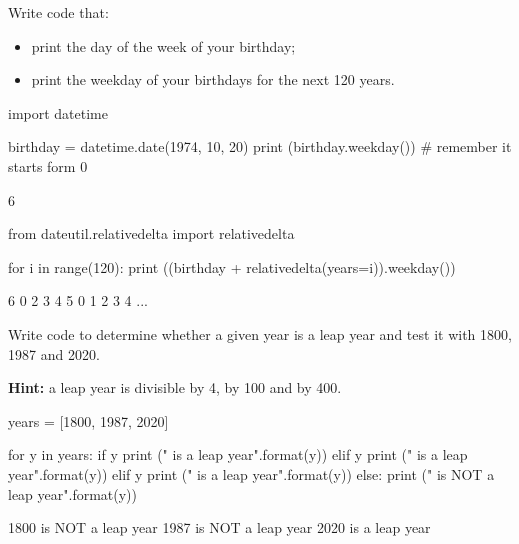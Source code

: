 \begin{question}
Write code that:

\begin{itemize}
\item print the day of the week of your birthday;
\item print the weekday of your birthdays for the next 120 years.
\end{itemize}
\end{question}

\cprotEnv\begin{solution}
\begin{ipython}
import datetime

birthday = datetime.date(1974, 10, 20)
print (birthday.weekday()) # remember it starts form 0
\end{ipython}
\begin{ioutput}
6
\end{ioutput}
\begin{ipython}
from dateutil.relativedelta import relativedelta

for i in range(120):
    print ((birthday + relativedelta(years=i)).weekday())
\end{ipython}
\begin{ioutput}
6
0
2
3
4
5
0
1
2
3
4
...
\end{ioutput}
\end{solution}

\begin{question}
Write code to determine whether a given year is a leap year and test it with 1800, 1987 and 2020.

\noindent\textbf{Hint:} a leap year is divisible by 4, by 100 and by 400.
\end{question}

\cprotEnv\begin{solution}
\begin{ipython}
years = [1800, 1987, 2020]

for y in years:
    if y %
        print ("{} is a leap year".format(y))
	elif y %
        print ("{} is a leap year".format(y)) 
    elif y %
        print ("{} is a leap year".format(y))
    else:
        print ("{} is NOT a leap year".format(y))
\end{ipython}
\begin{ioutput}
1800 is NOT a leap year
1987 is NOT a leap year
2020 is a leap year        
\end{ioutput}  
\end{solution}

